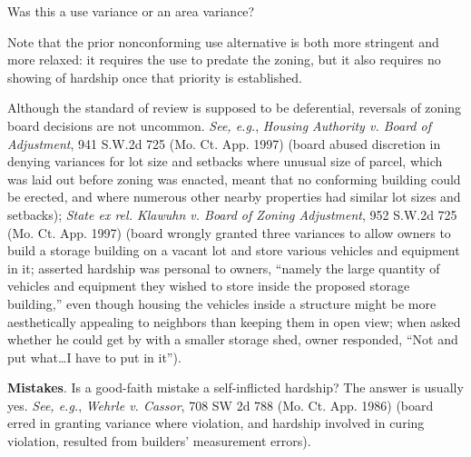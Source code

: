 
\item Was this a use variance or an area variance? 

\item
Note that the prior nonconforming use alternative is both more stringent and
more relaxed: it requires the use to predate the zoning, but it also requires no
showing of hardship once that priority is established.

\item
Although the standard of review is supposed to be deferential, reversals of
zoning board decisions are not uncommon. \textit{See, e.g.}, \emph{Housing
Authority v. Board of Adjustment},
941 S.W.2d 725 (Mo. Ct. App. 1997) (board abused discretion in denying
variances for lot size and setbacks where unusual size of parcel, which was laid
out before zoning was enacted, meant that no conforming building could be
erected, and where numerous other nearby properties had similar lot sizes and
setbacks); \emph{State ex rel. Klawuhn v. Board of Zoning Adjustment},
952 S.W.2d 725 (Mo. Ct. App. 1997) (board wrongly granted three
variances to allow owners to build a storage building on a vacant lot and store
various vehicles and equipment in it; asserted hardship was personal to owners,
``namely the large quantity of vehicles and equipment they wished to store
inside the proposed storage building,'' even though housing the vehicles inside
a structure might be more aesthetically appealing to neighbors than keeping them
in open view; when asked whether he could get by with a smaller storage shed,
owner responded, ``Not and put what\ldots I have to put in it''). 

\item
\textbf{Mistakes}. Is a good-faith mistake a self-inflicted hardship? The answer
is usually yes. \textit{See, e.g.}, \emph{Wehrle v. Cassor}, 708 SW 2d 788 (Mo.
Ct. App. 1986) (board erred in granting variance where violation, and hardship
involved in curing violation, resulted from builders' measurement errors).

